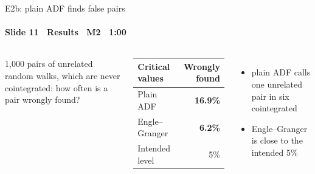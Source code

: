 \begin{frame}{E2b: plain ADF finds false pairs}
\framesubtitle{Slide 11 \textbullet\ Results \textbullet\ M2 \textbullet\ 1:00}
\vspace{-2pt}
\begin{columns}[T,onlytextwidth]
  \small\raggedright
  1{,}000 pairs of unrelated random walks, which are never cointegrated: how often is a pair wrongly found?\\[6pt]
  \footnotesize\setlength{\tabcolsep}{6pt}
  \begin{tabular}{@{}lr@{}}
    \toprule
    Critical values & Wrongly found \\
    \midrule
    Plain ADF & \textbf{16.9\%} \\
    Engle--Granger & \textbf{6.2\%} \\
    \midrule
    Intended level & 5\% \\
    \bottomrule
  \end{tabular}
  \normalsize\raggedright
  \begin{itemize}\setlength{\itemsep}{2pt}
    \item plain ADF calls one unrelated pair in six cointegrated
    \item Engle--Granger is close to the intended 5\%
  \end{itemize}
\end{columns}
\end{frame}
